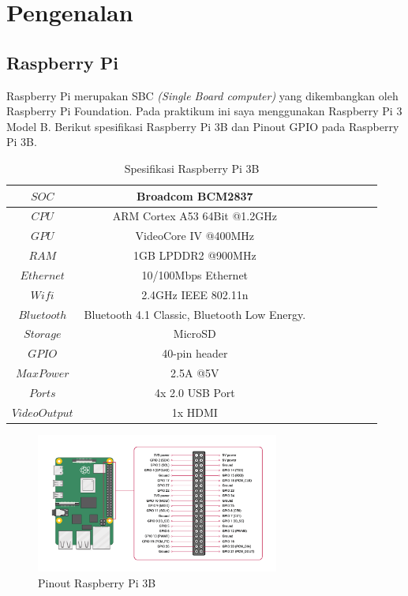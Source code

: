 \documentclass{class}
\begin{document}
\cover
    \chapter{Pengenalan}
    \section{Raspberry Pi}
    Raspberry Pi merupakan SBC \emph{(Single Board computer)} yang dikembangkan oleh Raspberry Pi Foundation.
    Pada praktikum ini saya menggunakan Raspberry Pi 3 Model B. Berikut spesifikasi Raspberry Pi 3B dan Pinout GPIO pada Raspberry Pi 3B. \\
    \begin{table}[h!]
      \begin{tabular}{|c|c|c|c|c|c|c|c|}
          \hline
          $SOC$ & Broadcom BCM2837 \\ \hline
          $CPU$ & ARM Cortex A53 64Bit @1.2GHz \\ \hline
          $GPU$ & VideoCore IV @400MHz\\ \hline
          $RAM$ & 1GB LPDDR2 @900MHz\\ \hline
          $Ethernet$ & 10/100Mbps Ethernet\\ \hline
          $Wifi$ & 2.4GHz IEEE 802.11n\\ \hline
          $Bluetooth$ & Bluetooth 4.1 Classic, Bluetooth Low Energy.\\ \hline
          $Storage$ & MicroSD\\ \hline
          $GPIO$ & 40-pin header\\ \hline
          $Max Power$ & 2.5A @5V\\ \hline
          $Ports$ & 4x 2.0 USB Port\\ \hline
          $Video Output$ & 1x HDMI\\ \hline
      \end{tabular}
      \caption{Spesifikasi Raspberry Pi 3B}
  \end{table}
  \begin{figure}[H]
    \centering
        \includegraphics[width=8cm]{gambar/GPIO-Pinout-Diagram-2.png}
        \caption{Pinout Raspberry Pi 3B}
        \label{pinout}
  \end{figure}
\end{document}
